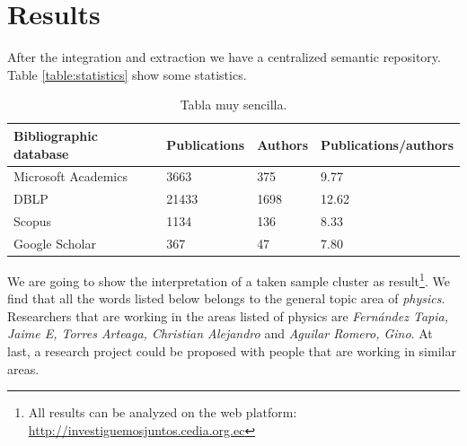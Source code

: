 \documentclass[11pt]{article}
\begin{document}
\section{Results}
\label{label:results}


After the integration and extraction we have a centralized semantic repository. Table \ref{table:statistics} show some statistics.


\begin{table}[htbp]
\begin{center}
\begin{tabular}{|l|l|l|l|}
\hline
Bibliographic database & Publications & Authors &  Publications/authors \\
\hline \hline
Microsoft Academics & 3663  & 375 & 9.77 \\ \hline
DBLP & 21433 & 1698 &  12.62 \\ \hline
Scopus &  1134 & 136 & 8.33 \\ \hline
Google Scholar & 367 & 47 & 7.80 \\ \hline
\end{tabular}
\caption{Tabla muy sencilla.}
\label{tabla:sencilla}
\end{center}
\end{table}



We are going to show the interpretation of a taken sample cluster  as result\footnote{All results can be analyzed on the web platform: \url{http://investiguemosjuntos.cedia.org.ec}}. We find that all the words listed below belongs to the general topic area of \emph{physics}. Researchers that are working in the areas listed of physics are \emph{Fern\'andez Tapia, Jaime E, Torres Arteaga, Christian Alejandro} and \emph{Aguilar Romero, Gino}. At last, a research project could be proposed with people that are working in similar areas. 
\end{document}

